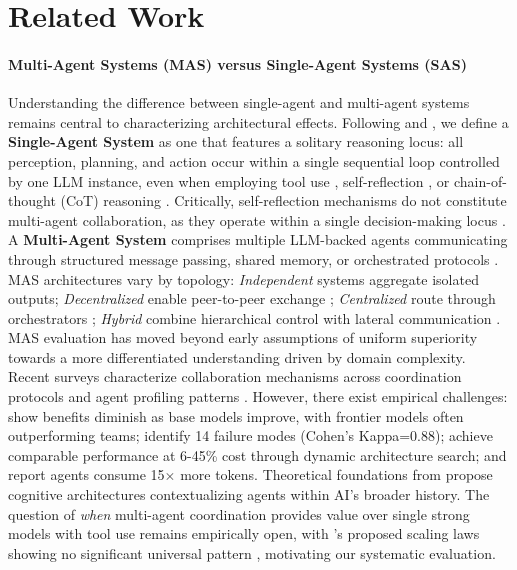 \section{Related Work}

\paragraph{Multi-Agent Systems (MAS) versus Single-Agent Systems (SAS)}

Understanding the difference between single-agent and multi-agent systems remains central to characterizing architectural effects. Following \citet{tran2025multiagent} and \citet{guo2024large}, we define a \textbf{Single-Agent System} as one that features a solitary reasoning locus: all perception, planning, and action occur within a single sequential loop controlled by one LLM instance, even when employing tool use \citep{yao2023react}, self-reflection \citep{shinn2023reflexion}, or chain-of-thought (CoT) reasoning \citep{wei2022emergent}. Critically, self-reflection mechanisms do not constitute multi-agent collaboration, as they operate within a single decision-making locus \citep{weng2023llmagent}. A \textbf{Multi-Agent System} comprises multiple LLM-backed agents communicating through structured message passing, shared memory, or orchestrated protocols \citep{xi2025rise}. MAS architectures vary by topology: \textit{Independent} systems aggregate isolated outputs; \textit{Decentralized} enable peer-to-peer exchange \citep{du2023improving}; \textit{Centralized} route through orchestrators \citep{hong2024metagpt}; \textit{Hybrid} combine hierarchical control with lateral communication \citep{dang2025evolving}. MAS evaluation has moved beyond early assumptions of uniform superiority \citep{li2024more, qian2024scaling} towards a more differentiated understanding driven by domain complexity. Recent surveys characterize collaboration mechanisms across coordination protocols \citep{tran2025multiagent} and agent profiling patterns \citep{guo2024large}. However, there exist empirical challenges: \citet{gao2025single} show benefits diminish as base models improve, with frontier models often outperforming teams; \citet{cemri2025multi} identify 14 failure modes (Cohen's Kappa=0.88); \citet{zhang2025maas} achieve comparable performance at 6-45\% cost through dynamic architecture search; and \citet{anthropic2024multiagent} report agents consume 15$\times$ more tokens. Theoretical foundations from \citet{sumers2024cognitive} propose cognitive architectures contextualizing agents within AI's broader history. The question of \textit{when} multi-agent coordination provides value over single strong models with tool use remains empirically open, with \citet{qian2024scaling}'s proposed scaling laws showing no significant universal pattern \citep{wang2024survey}, motivating our systematic evaluation.

